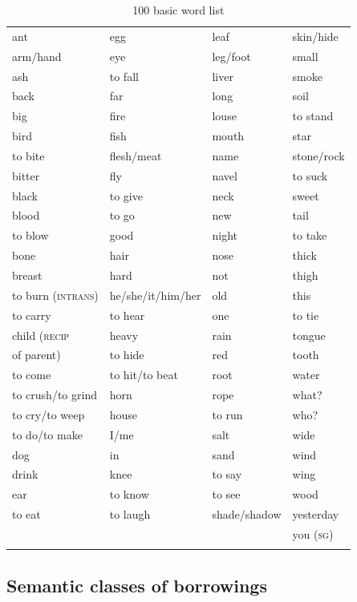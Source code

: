 \documentclass[output=paper]{LSP/langsci}
\begin{document}
\begin{table}
\caption{\citet{Leipzig-Jakarta2009} 100 basic word list} \label{LJ100}
\begin{tabular}[h]{llll}
\lsptoprule
ant & egg & leaf & skin/hide\\
arm/hand & eye & leg/foot & small \\
ash & to fall & liver & smoke \\
back & far & long & soil \\
big & fire & louse & to stand \\
bird & fish & mouth & star \\
to bite & flesh/meat & name  & stone/rock \\
bitter & fly & navel & to suck \\
black & to give & neck & sweet \\
blood & to go & new & tail \\
to blow & good & night & to take \\
bone & hair & nose & thick \\
breast & hard & not & thigh \\
to burn (\textsc{intrans}) & he/she/it/him/her & old & this \\
to carry & to hear & one & to tie \\
child (\textsc{recip}  & heavy & rain & tongue \\
\hspace{1em} of parent) & to hide & red & tooth \\
to come & to hit/to beat & root & water \\
to crush/to grind & horn & rope & what? \\
to cry/to weep & house & to run & who? \\
to do/to make & I/me & salt & wide \\
dog  & in & sand & wind \\
drink & knee & to say & wing \\
ear & to know & to see & wood\\
to eat & to laugh & shade/shadow & yesterday \\
&  &  & you (\textsc{sg}) \\
\lspbottomrule
\end{tabular}
\end{table}

\subsection{Semantic classes of borrowings}
	
\end{document}

